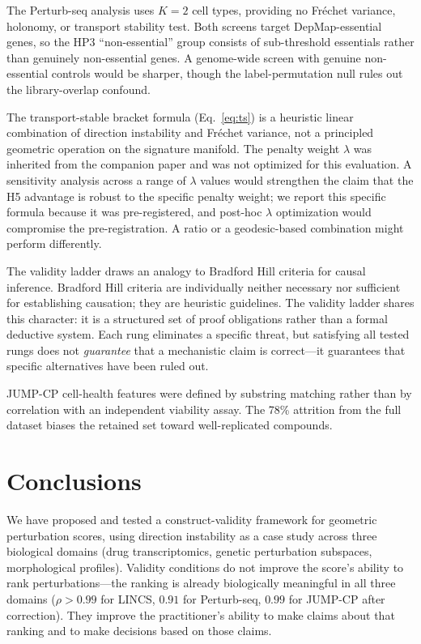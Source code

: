 \documentclass[11pt]{article}
\begin{document}
The Perturb-seq analysis uses $K = 2$ cell types, providing no Fr\'echet
variance, holonomy, or transport stability test. Both screens target
DepMap-essential genes, so the HP3 ``non-essential'' group consists of
sub-threshold essentials rather than genuinely non-essential genes. A
genome-wide screen with genuine non-essential controls would be sharper,
though the label-permutation null rules out the library-overlap confound.

The transport-stable bracket formula (Eq.~\ref{eq:ts}) is a heuristic
linear combination of direction instability and Fr\'echet variance, not a
principled geometric operation on the signature manifold. The penalty
weight $\lambda$ was inherited from the companion paper
\citep{tower2026drug} and was not optimized for this evaluation. A
sensitivity analysis across a range of $\lambda$ values would strengthen
the claim that the H5 advantage is robust to the specific penalty
weight; we report this specific formula because it was pre-registered,
and post-hoc $\lambda$ optimization would compromise the pre-registration.
A ratio or a geodesic-based combination might perform differently.

The validity ladder draws an analogy to Bradford Hill criteria for causal
inference. Bradford Hill criteria are individually neither necessary nor
sufficient for establishing causation; they are heuristic guidelines. The
validity ladder shares this character: it is a structured set of proof
obligations rather than a formal deductive system. Each rung eliminates
a specific threat, but satisfying all tested rungs does not
\emph{guarantee} that a mechanistic claim is correct---it guarantees
that specific alternatives have been ruled out.

JUMP-CP cell-health features were defined by substring matching rather
than by correlation with an independent viability assay. The 78\% attrition
from the full dataset biases the retained set toward well-replicated
compounds.

\section{Conclusions}

We have proposed and tested a construct-validity framework for geometric
perturbation scores, using direction instability as a case study across
three biological domains (drug transcriptomics, genetic perturbation
subspaces, morphological profiles). Validity conditions do not improve the
score's ability to rank perturbations---the ranking is already biologically
meaningful in all three domains ($\rho > 0.99$ for LINCS, $0.91$ for
Perturb-seq, $0.99$ for JUMP-CP after correction). They improve the
practitioner's ability to make claims about that ranking and to make
decisions based on those claims.
\end{document}
